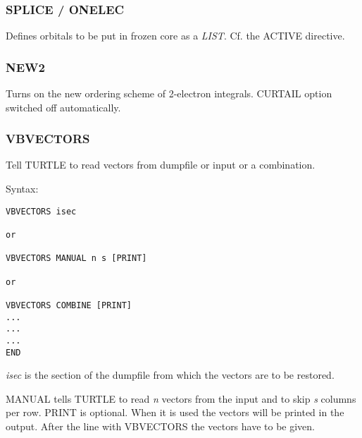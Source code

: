\documentclass[11pt,fleqn]{article}
\begin{document}
\subsubsection{SPLICE / ONELEC}

Defines orbitals to be put in frozen core as a  \textit{LIST}. Cf. the ACTIVE directive.

\subsubsection{NEW2}

Turns on the new ordering scheme of 2-electron integrals. CURTAIL option
switched off automatically.

\subsubsection{VBVECTORS}

Tell TURTLE to read vectors from dumpfile or input or a combination.

Syntax: 

\begin{verbatim}
VBVECTORS isec

or 

VBVECTORS MANUAL n s [PRINT]

or

VBVECTORS COMBINE [PRINT]
...
...
...
END
\end{verbatim}

\emph{isec} is the section of the dumpfile from which the vectors are to be
restored. 

MANUAL tells TURTLE to read \emph{n} vectors from the input and to skip \emph{s} columns
per row. PRINT is optional. When it is used the vectors will be printed in the output.
After the line with VBVECTORS the vectors have to be given.
\end{document}
